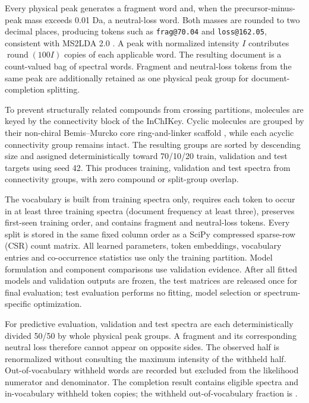 \documentclass[10pt,a4paper]{article}
\begin{document}
Every physical peak generates a fragment word and, when the
precursor-minus-peak mass exceeds 0.01 Da, a neutral-loss word. Both masses are
rounded to two decimal places, producing tokens such as
\texttt{frag@70.04} and \texttt{loss@162.05}, consistent with MS2LDA 2.0
\cite{torresortega2026}. A peak with normalized intensity $I$ contributes
$\operatorname{round}(100I)$ copies of each applicable word. The resulting
document is a count-valued bag of spectral words. Fragment and neutral-loss
tokens from the same peak are additionally retained as one physical peak group
for document-completion splitting.

To prevent structurally related compounds from crossing partitions, molecules
are keyed by the connectivity block of the InChIKey. Cyclic molecules are
grouped by their non-chiral Bemis--Murcko core ring-and-linker scaffold
\cite{bemismurcko1996}, while
each acyclic connectivity group remains intact. The \SplitGroups{} resulting
groups are sorted by descending size and assigned deterministically toward
70/10/20 train, validation and test targets using seed 42. This produces
\TrainingSpectra{} training, \ValidationSpectra{} validation and
\TestSpectra{} test spectra from \ConnectivityGroups{} connectivity groups,
with zero compound or split-group overlap.

The vocabulary is built from training spectra only, requires each token to
occur in at least three training spectra (document frequency at least three),
preserves first-seen training order, and contains
\VocabularySize{} fragment and neutral-loss tokens. Every split is stored in
the same fixed column order as a SciPy compressed sparse-row (CSR) count matrix.
All learned parameters, token embeddings, vocabulary entries and co-occurrence
statistics use only the training partition. Model formulation and component
comparisons use validation evidence. After all fitted models and validation
outputs are frozen, the test matrices are released once for final evaluation;
test evaluation performs no fitting, model selection or spectrum-specific
optimization.

For predictive evaluation, validation and test spectra are each deterministically
divided 50/50 by whole physical peak groups. A fragment and its corresponding neutral
loss therefore cannot appear
on opposite sides. The observed half is renormalized without consulting the
maximum intensity of the withheld half. Out-of-vocabulary withheld words are
recorded but excluded from the likelihood numerator and denominator. The
completion result contains \CompletionDocuments{} eligible spectra and
\CompletionTokens{} in-vocabulary withheld token copies; the withheld
out-of-vocabulary fraction is \CompletionOOV{}.
\end{document}
